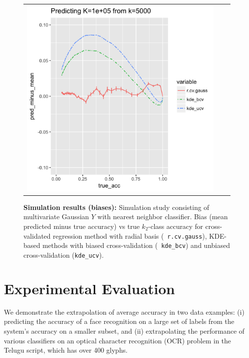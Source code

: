 \documentclass[twoside,11pt]{article}
\begin{document}
\begin{figure}
\begin{tabular}{ccc}
\includegraphics[scale = 0.45, clip = true, trim = .3in 0 0.00in 0.4in]{sim_large7_biaz_K100_k5.png}\\ 
\end{tabular}
\caption{\textbf{Simulation results (biases):} Simulation study
  consisting of multivariate Gaussian $Y$ with nearest neighbor
  classifier.  Bias (mean predicted minus true accuracy) vs true $k_2$-class accuracy
  for cross-validated regression method with radial basis ({\tt
    r.cv.gauss}), KDE-based methods with biased cross-validation ({\tt
    kde\_bcv}) and unbiased cross-validation ({\tt kde\_ucv}).}
\label{fig:sim_study_bias}
\end{figure}





\section{Experimental Evaluation}\label{sec:extrapolation_example}

We demonstrate the extrapolation of average accuracy in two data examples:
(i) predicting the
accuracy of a face recognition on a large set of labels from the
system's accuracy on a smaller subset, and (ii) extrapolating the performance of various classifiers on an optical character recognition (OCR) problem in the Telugu script, which has over 400 glyphs.
\end{document}

